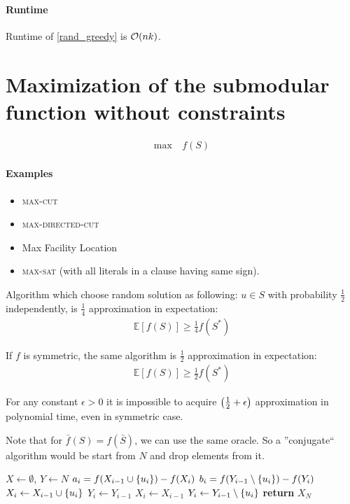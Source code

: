 \paragraph{Runtime} Runtime of \vref{rand_greedy} is $\order{nk}$.

\section{Maximization of the submodular function without constraints}
\begin{align}
\max \: & f(S)
\end{align}
\paragraph{Examples}
\begin{itemize}
\item \textsc{max-cut}
\item \textsc{max-directed-cut}
\item Max Facility Location
\item \textsc{max-sat} (with all literals in a clause having same sign).
\end{itemize}

\begin{prop}
	Algorithm which choose random solution as following: $u\in S$ with probability $\frac{1}{2}$ independently, is $\frac{1}{4}$ approximation in expectation:
	\begin{align}
	\mathbb{E}[f(S)] \geq \frac{1}{4} f(S^*)
	\end{align}
\end{prop}
\begin{prop}
If $f$ is symmetric, the same algorithm is $\frac{1}{2}$ approximation in expectation:
\begin{align}
\mathbb{E}[f(S)] \geq \frac{1}{2} f(S^*)
\end{align}
\end{prop}
\begin{prop}
For any constant $\epsilon>0$ it is impossible to acquire $\qty(\frac{1}{2}+\epsilon)$ approximation in polynomial time, even in  symmetric case.
\end{prop}

Note that for $\bar{f}(S) = f(\bar{S})$, we can use the same oracle. So a ''conjugate`` algorithm would be start from $N$ and drop elements from it.


\begin{algorithm}
	\caption{}\label{alg:double_greedy}
	\begin{algorithmic}[1]
		\State $X \gets \emptyset$, $Y \gets N$
		\State $a_i = f(X_{i-1} \cup \qty{u_i})-f(X_i)$
		\State $b_i = f(Y_{i-1} \setminus \qty{u_i})-f(Y_i)$
		\State $X_i \gets X_{i-1} \cup \qty{u_i}$
		\State $Y_i \gets Y_{i-1}$
		\Else
		\State $X_i \gets X_{i-1}$
		\State $Y_i \gets Y_{i-1} \setminus \qty{u_i}$
		\EndIf
		\EndFor
		\State \textbf{return} $X_N$
		\EndProcedure
	\end{algorithmic}
\end{algorithm}


